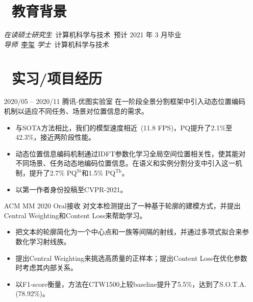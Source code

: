 \documentclass{resume}
\begin{document}
	
	
	
	\section{\faGraduationCap\  教育背景}
	\textit{在读硕士研究生}\ 计算机科学与技术\ 预计 2021 年 3 月毕业\\
	\textit{导师}\ \href{https://person.zju.edu.cn/xilics}{李玺} 
	\vspace{-0.25em}
	\textit{学士}\ 计算机科学与技术
	\vspace{-0.5em}
	
	\section{\faUsers\ 实习/项目经历}
	 {2020/05 -- 2020/11}
	 {腾讯-优图实验室}
	在一阶段全景分割框架中引入动态位置编码机制以适应不同任务、场景对位置信息的需求。
	\vspace{-0.2em}
	\begin{itemize}
		\item 与SOTA方法相比，我们的模型速度相近~(11.8 FPS)，PQ提升了2.1\%至42.3\%，接近两阶段性能。
		\item 动态位置信息编码机制通过IDFT参数化学习全局空间位置相关性，使其能对不同场景、任务动态地编码位置信息。在语义和实例分割分支中引入这一机制，提升了2.7\% $\text{PQ}^\text{St}$和1.5\% $\text{PQ}^\text{Th}$。
		\item 以第一作者身份投稿至CVPR-2021。
	\end{itemize}

	
	\role{研究} {ACM MM 2020 Oral接收}
	对文本检测提出了一种基于轮廓的建模方式，并提出Central Weighting和Content Loss来帮助学习。
	\vspace{-0.2em}
	\begin{itemize}
		\item 把文本的轮廓简化为一个中心点和一族等间隔的射线，并通过多项式拟合来参数化学习射线族。
		\item 提出Central Weighting来挑选高质量的正样本；提出Content Loss在优化参数时考虑其内部关系。
		\item 以F1-score衡量，方法在CTW1500上较baseline提升了5.5\%，达到了S.O.T.A.(78.92\%)。
	\end{itemize}
	\vspace{-0.25em}
	
\end{document}
